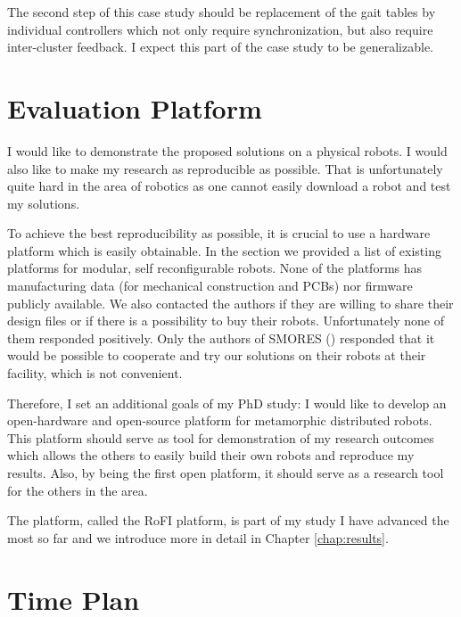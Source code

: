 The second step of this case study should be replacement of the gait tables by
individual controllers which not only require synchronization, but also require
inter-cluster feedback. I expect this part of the case study to be
generalizable.

\section{Evaluation Platform}

I would like to demonstrate the proposed solutions on a physical robots. I would
also like to make my research as reproducible as possible. That is unfortunately
quite hard in the area of robotics as one cannot easily download a robot and
test my solutions.

To achieve the best reproducibility as possible, it is crucial to use a hardware
platform which is easily obtainable. In the section  we provided a list of existing platforms for modular, self
reconfigurable robots. None of the platforms has manufacturing data (for
mechanical construction and PCBs) nor firmware publicly available. We also
contacted the authors if they are willing to share their design files or if
there is a possibility to buy their robots. Unfortunately none of them responded
positively. Only the authors of SMORES () responded that it would
be possible to cooperate and try our solutions on their robots at their
facility, which is not convenient.

Therefore, I set an additional goals of my PhD study: I would like to develop an
open-hardware and open-source platform for metamorphic distributed robots. This
platform should serve as tool for demonstration of my research outcomes which
allows the others to easily build their own robots and reproduce my results.
Also, by being the first open platform, it should serve as a research tool for
the others in the area.

The platform, called the RoFI platform, is part of my study I have advanced the
most so far and we introduce more in detail in Chapter \ref{chap:results}.

\section{Time Plan}

